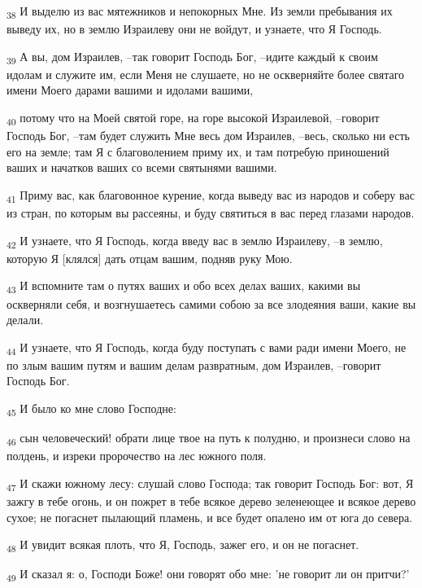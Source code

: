 \begin{tcolorbox}
\textsubscript{38} И выделю из вас мятежников и непокорных Мне. Из земли пребывания их выведу их, но в землю Израилеву они не войдут, и узнаете, что Я Господь.
\end{tcolorbox}
\begin{tcolorbox}
\textsubscript{39} А вы, дом Израилев, --так говорит Господь Бог, --идите каждый к своим идолам и служите им, если Меня не слушаете, но не оскверняйте более святаго имени Моего дарами вашими и идолами вашими,
\end{tcolorbox}
\begin{tcolorbox}
\textsubscript{40} потому что на Моей святой горе, на горе высокой Израилевой, --говорит Господь Бог, --там будет служить Мне весь дом Израилев, --весь, сколько ни есть его на земле; там Я с благоволением приму их, и там потребую приношений ваших и начатков ваших со всеми святынями вашими.
\end{tcolorbox}
\begin{tcolorbox}
\textsubscript{41} Приму вас, как благовонное курение, когда выведу вас из народов и соберу вас из стран, по которым вы рассеяны, и буду святиться в вас перед глазами народов.
\end{tcolorbox}
\begin{tcolorbox}
\textsubscript{42} И узнаете, что Я Господь, когда введу вас в землю Израилеву, --в землю, которую Я [клялся] дать отцам вашим, подняв руку Мою.
\end{tcolorbox}
\begin{tcolorbox}
\textsubscript{43} И вспомните там о путях ваших и обо всех делах ваших, какими вы оскверняли себя, и возгнушаетесь самими собою за все злодеяния ваши, какие вы делали.
\end{tcolorbox}
\begin{tcolorbox}
\textsubscript{44} И узнаете, что Я Господь, когда буду поступать с вами ради имени Моего, не по злым вашим путям и вашим делам развратным, дом Израилев, --говорит Господь Бог.
\end{tcolorbox}
\begin{tcolorbox}
\textsubscript{45} И было ко мне слово Господне:
\end{tcolorbox}
\begin{tcolorbox}
\textsubscript{46} сын человеческий! обрати лице твое на путь к полудню, и произнеси слово на полдень, и изреки пророчество на лес южного поля.
\end{tcolorbox}
\begin{tcolorbox}
\textsubscript{47} И скажи южному лесу: слушай слово Господа; так говорит Господь Бог: вот, Я зажгу в тебе огонь, и он пожрет в тебе всякое дерево зеленеющее и всякое дерево сухое; не погаснет пылающий пламень, и все будет опалено им от юга до севера.
\end{tcolorbox}
\begin{tcolorbox}
\textsubscript{48} И увидит всякая плоть, что Я, Господь, зажег его, и он не погаснет.
\end{tcolorbox}
\begin{tcolorbox}
\textsubscript{49} И сказал я: о, Господи Боже! они говорят обо мне: 'не говорит ли он притчи?'
\end{tcolorbox}
